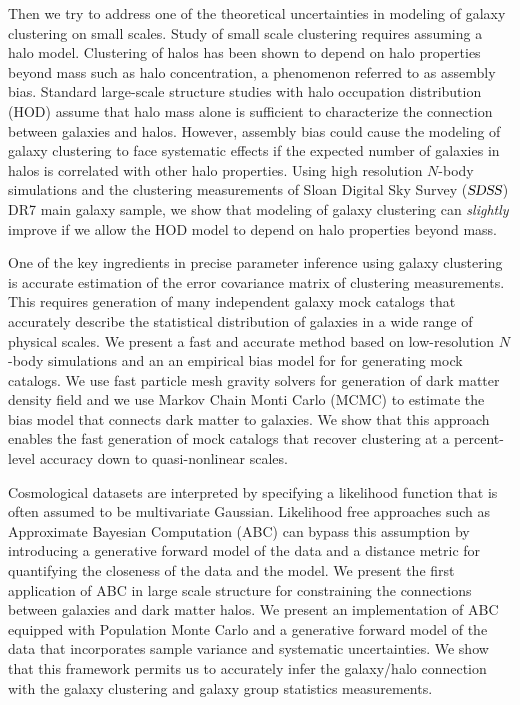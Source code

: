 Then we try to address one of the theoretical uncertainties in modeling of galaxy clustering on small scales. Study of small scale clustering requires assuming a halo model. Clustering of halos has been shown to depend on halo properties beyond mass such as halo concentration, a phenomenon referred to as assembly bias. Standard large-scale structure studies with halo occupation distribution (HOD) assume that halo mass alone is sufficient to characterize the connection between galaxies and halos. However, assembly bias could cause the modeling of galaxy clustering to face systematic effects if the expected number of galaxies in halos is correlated with other halo properties. Using high resolution $N$-body simulations and the clustering measurements of Sloan Digital Sky Survey (${\textsl{SDSS}}$) DR7 main galaxy sample, we show that modeling of galaxy clustering can \emph{slightly} improve if we allow the HOD model to depend on halo properties beyond mass.

One of the key ingredients in precise parameter inference using galaxy clustering is accurate estimation of the error covariance matrix of clustering measurements. This requires generation of many independent galaxy mock catalogs that accurately describe the statistical distribution of galaxies in a wide range of physical scales. We present a fast and accurate method based on low-resolution $N$-body simulations and an an empirical bias model for for generating mock catalogs. We use fast particle mesh gravity solvers for generation of dark matter density field and we use Markov Chain Monti Carlo (MCMC) to estimate the bias model that connects dark matter to galaxies. We show that this approach enables the fast generation of mock catalogs that recover clustering at a percent-level accuracy down to quasi-nonlinear scales. 

Cosmological datasets are interpreted by specifying a likelihood function that is often assumed to be multivariate Gaussian. Likelihood free approaches such as Approximate Bayesian Computation (ABC) can bypass this assumption by introducing a generative forward model of the data and a distance metric for quantifying the closeness of the data and the model. We present the first application of ABC in large scale structure for constraining the connections between galaxies and dark matter halos. 
We present an implementation of ABC equipped with Population Monte Carlo and a generative forward model of the data that incorporates sample variance and systematic uncertainties.
We show that this framework permits us to accurately infer the galaxy/halo connection with the galaxy clustering and galaxy group statistics measurements.  
